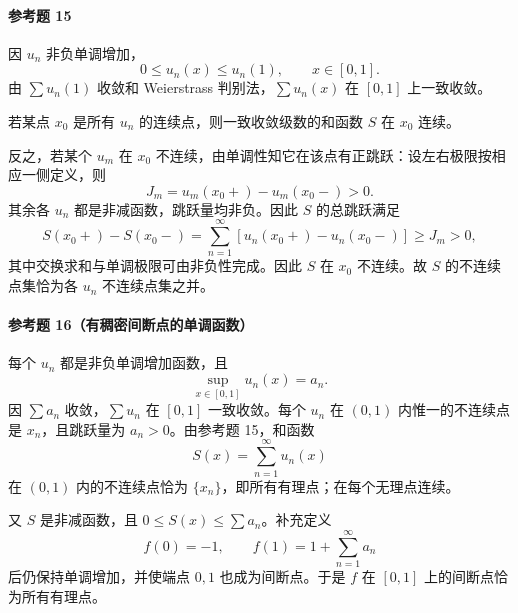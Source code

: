\paragraph{参考题 15}
\begin{xsolution}
因 $u_n$ 非负单调增加，
\[
  0\leqslant u_n(x)\leqslant u_n(1),
  \qquad x\in[0,1].
\]
由 $\sum u_n(1)$ 收敛和 Weierstrass 判别法，$\sum u_n(x)$ 在 $[0,1]$ 上一致收敛。

若某点 $x_0$ 是所有 $u_n$ 的连续点，则一致收敛级数的和函数 $S$ 在 $x_0$ 连续。

反之，若某个 $u_m$ 在 $x_0$ 不连续，由单调性知它在该点有正跳跃：设左右极限按相应一侧定义，则
\[
  J_m=u_m(x_0+)-u_m(x_0-)>0.
\]
其余各 $u_n$ 都是非减函数，跳跃量均非负。因此 $S$ 的总跳跃满足
\[
  S(x_0+)-S(x_0-)
  =\sum_{n=1}^{\infty}[u_n(x_0+)-u_n(x_0-)]
  \geqslant J_m>0,
\]
其中交换求和与单调极限可由非负性完成。因此 $S$ 在 $x_0$ 不连续。故 $S$ 的不连续点集恰为各 $u_n$ 不连续点集之并。
\end{xsolution}

\paragraph{参考题 16（有稠密间断点的单调函数）}
\begin{xsolution}
每个 $u_n$ 都是非负单调增加函数，且
\[
  \sup_{x\in[0,1]}u_n(x)=a_n.
\]
因 $\sum a_n$ 收敛，$\sum u_n$ 在 $[0,1]$ 一致收敛。每个 $u_n$ 在 $(0,1)$ 内惟一的不连续点是 $x_n$，且跳跃量为 $a_n>0$。由参考题 15，和函数
\[
  S(x)=\sum_{n=1}^{\infty}u_n(x)
\]
在 $(0,1)$ 内的不连续点恰为 $\{x_n\}$，即所有有理点；在每个无理点连续。

又 $S$ 是非减函数，且 $0\leqslant S(x)\leqslant\sum a_n$。补充定义
\[
  f(0)=-1,
  \qquad f(1)=1+\sum_{n=1}^{\infty}a_n
\]
后仍保持单调增加，并使端点 $0,1$ 也成为间断点。于是 $f$ 在 $[0,1]$ 上的间断点恰为所有有理点。
\end{xsolution}

